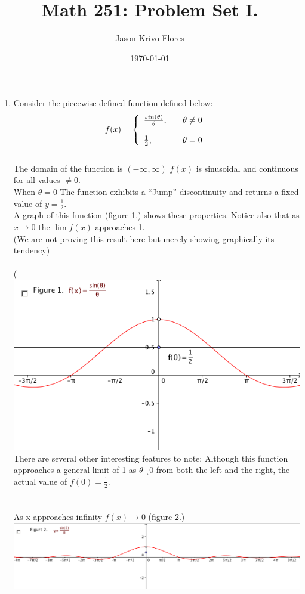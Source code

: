 \documentclass{article}
\title{Math 251: Problem Set I.}
\author{Jason Krivo Flores}
\date{\today}
\begin{document}
\maketitle{}
%
\begin{enumerate}
 \item Consider the piecewise defined function defined below:\\
\[
  f(x) = \left\{ 
  \begin{array}{l l}
    \frac{ sin(\theta)}{\theta}, \quad &  \theta \neq 0\\
    \\
      \frac{1}{2},  \quad &  \theta= 0\\
  \end{array} \right. \\
\]
\\
The domain of the function is $(-\infty, \infty)$
$f(x)$ is sinusoidal and continuous for all values $\neq 0$.\\ When $\theta = 0$ The function exhibits a ``Jump'' discontinuity and returns a fixed value of $y = \frac{1}{2}$.\\
A graph of this function (figure 1.) shows these properties. Notice also that as $x \to 0$ the $ \lim f(x) $ approaches 1.\\
(We are not proving this result here but merely showing graphically its tendency)\\
\\(\includegraphics[scale=0.5]{singraph}\\
There are several other interesting features to note: Although this function approaches a general limit of 1 as $\theta_\to 0$ from both the left and the right, the actual value of $f(0) = \frac{1}{2}$.\\
\\
\\As x approaches infinity $f (x) \to 0$ (figure 2.)\\
%
{\includegraphics[scale=0.5]{longview}}\\


\end{enumerate}
\end{document}
